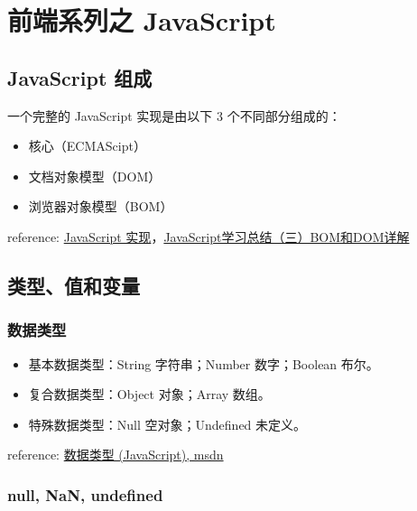 \chapter{前端系列之 JavaScript}\hypertarget{javascript}{}\label{javascript}

\section{JavaScript 组成}\hypertarget{javascript-}{}\label{javascript-}

一个完整的 JavaScript 实现是由以下 3 个不同部分组成的：

\begin{itemize}
\item 核心（ECMAScipt）
\item 文档对象模型（DOM）
\item 浏览器对象模型（BOM）
\end{itemize}

reference: \href{http://www.w3school.com.cn/js/pro\_js\_implement.asp}{JavaScript 实现}，\href{http://segmentfault.com/a/1190000000654274}{JavaScript学习总结（三）BOM和DOM详解}

\section{类型、值和变量}\hypertarget{section}{}\label{section}

\subsection{数据类型}\hypertarget{section-1}{}\label{section-1}

\begin{itemize}
\item 基本数据类型：String 字符串；Number 数字；Boolean 布尔。
\item 复合数据类型：Object 对象；Array 数组。
\item 特殊数据类型：Null 空对象；Undefined 未定义。
\end{itemize}

reference: \href{https://msdn.microsoft.com/zh-cn/library/7wkd9z69(v=vs.94).aspx}{数据类型 (JavaScript), msdn}

\subsection{null, NaN, undefined}\hypertarget{null-nan-undefined}{}\label{null-nan-undefined}

